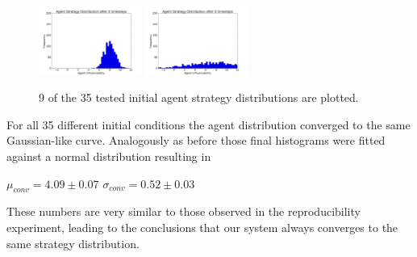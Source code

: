 \documentclass[11pt]{article}
\begin{document}
\begin{figure}
  \includegraphics[width=0.3\textwidth]{figures/ic8.png}
  \includegraphics[width=0.3\textwidth]{figures/ic9.png}
  \caption[Different Initial Conditions]{9 of the 35 tested initial agent strategy distributions are plotted.}
  \label{fig:initialconditions}
\end{figure}
For all 35 different initial conditions the agent distribution converged to the same Gaussian-like curve. Analogously as before those final histograms were fitted against a normal distribution resulting in
\begin{center}
  $\mu_{conv} = 4.09\pm 0.07$
  $\sigma_{conv} = 0.52\pm 0.03$
\end{center}
These numbers are very similar to those observed in the reproducibility experiment, leading to the conclusions that our system always converges to the same strategy distribution.
\end{document}

